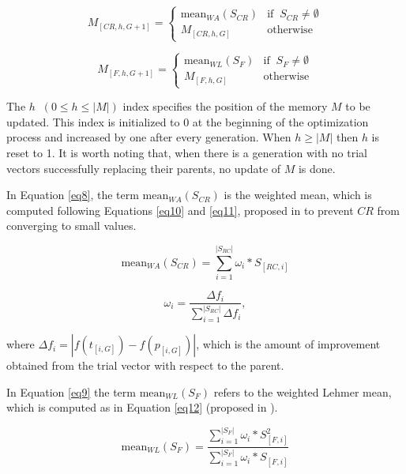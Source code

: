 \documentclass[review]{elsarticle}
\begin{document}
\begin{equation}
M_{[CR,h,G+1]} = \left\{ \begin{array}{lc}
\text{mean}_{WA} (S_{CR}) & \text{if} \;\; S_{CR} \neq \emptyset \\
M_{[CR,h,G]} &  \text{otherwise}
\end{array}
\right.
\label{eq8}
\end{equation}

\begin{equation}
M_{[F,h,G+1]} = \left\{ \begin{array}{lc}
\text{mean}_{WL} (S_{F}) & \text{if} \;\; S_{F} \neq \emptyset \\
M_{[F,h,G]} &  \text{otherwise}
\end{array}
\right.
\label{eq9}
\end{equation}

The $h \;\; (0 \le h \le |M|)$ index specifies the position of the memory $M$ to be updated. This index is initialized to $0$ at the beginning of the optimization process and increased by one after every generation. When $h \ge |M|$ then $h$ is reset to 1. It is worth noting that, when there is a generation with no trial vectors successfully replacing their parents, no update of $M$ is done.

In Equation \ref{eq8}, the term $\text{mean}_{WA} (S_{CR})$ is the weighted mean, which is computed following Equations \eqref{eq10} and \eqref{eq11}, proposed in \cite{peng2009multi} to prevent $CR$ from converging to small values.

\begin{equation}
\text{mean}_{WA} (S_{CR}) = \sum_{i = 1}^{|S_{RC}|} \omega_i * S_{[RC,i]}
\label{eq10}
\end{equation}

\begin{equation}
\omega_i = \frac{\Delta f_i}{\sum_{i = 1}^{|S_{RC}|} \Delta f_i},
\label{eq11}
\end{equation}

\noindent where $\Delta f_i = |f(t_{[i,G]}) - f(p_{[i, G]})|$, which is the amount of improvement obtained from the trial vector with respect to the parent.

In Equation \ref{eq9} the term $\text{mean}_{WL} (S_{F})$ refers to the weighted Lehmer mean, which is computed as in Equation \eqref{eq12} (proposed in \cite{tanabe2013success}).

\begin{equation}
\text{mean}_{WL} (S_{F}) = \frac{\sum_{i = 1}^{|S_{F}|} \omega_i * S^2_{[F,i]}}{\sum_{i = 1}^{|S_{F}|} \omega_i * S_{[F,i]}}
\label{eq12}
\end{equation}
\end{document}

